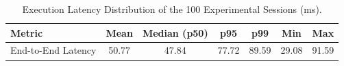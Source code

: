 \begin{table}[!htbp]
\renewcommand{\arraystretch}{1.05}
\centering
\small
\caption{Execution Latency Distribution of the 100 Experimental Sessions (ms).}
\label{tab:session_latency}
\vspace{4pt}
\begin{tabular}{l c c c c c c}
\hline
Metric & Mean & Median (p50) & p95 & p99 & Min & Max \\
\hline
End-to-End Latency & 50.77 & 47.84 & 77.72 & 89.59 & 29.08 & 91.59 \\
\hline
\end{tabular}
\end{table}

